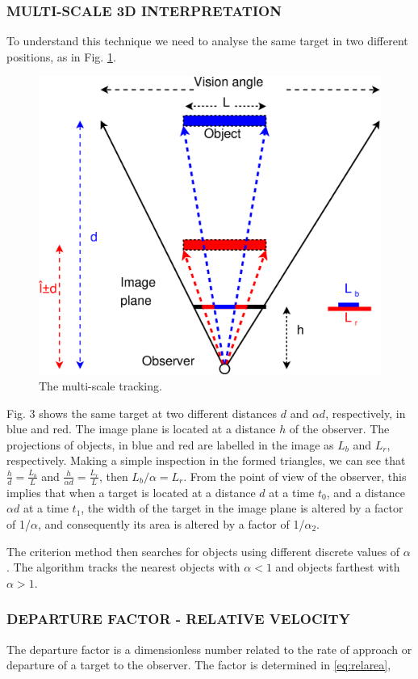\subsubsection{MULTI-SCALE 3D INTERPRETATION}
To understand this technique we need to analyse the same target in 
two different positions, as in Fig. \ref{fig:multiscale3d}.

\begin{figure}[H]
\centering
  \includegraphics[width=.7\columnwidth]{images/Diagrama3.eps}
  \caption{The multi-scale tracking.}
  \label{fig:multiscale3d}
\end{figure}
Fig. 3 shows the same target at two different distances $d$ and $\alpha d$, respectively, in blue and red.
The image plane is located at a distance $h$ of the observer.
The projections of objects, in blue and red are labelled in the image as
$L_b$ and $L_r$, respectively. Making a simple inspection in the
formed triangles, we can see that $\frac{h}{d}=\frac{L_b}{L}$ and 
$\frac{h}{\alpha d}=\frac{L_r}{L}$, then $L_b/\alpha= L_r$. 
From the point of view of the observer, this implies that when a target 
is located at a distance $d$ at a time $t_0$,  and a distance $\alpha d$ at a time $t_1$, 
the width of the target in the image plane is altered by a factor of 1/$\alpha$, and consequently its area is altered by a factor of 1/$\alpha_2$.

The criterion method then searches for objects using different discrete values of $\alpha$. 
The algorithm tracks the nearest objects with $\alpha<1$ and objects farthest with $\alpha>1$.


\subsubsection{DEPARTURE FACTOR - RELATIVE VELOCITY}
The departure factor is a dimensionless number related to the rate of approach 
or departure of a target to the observer. The factor
is determined in \ref{eq:relarea},

